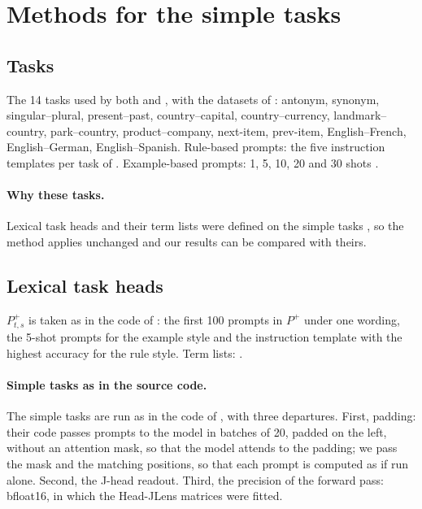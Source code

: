 \documentclass[11pt,a4paper]{article}
\begin{document}
\section{Methods for the simple tasks}\label{sec:methods-simple}

\subsection{Tasks}\label{sec:tasks-simple}
The 14 tasks used by both \citet{yang2026shared} and \citet{davidson2025different}, with the datasets of \citet{todd2024function}: antonym, synonym, singular--plural, present--past, country--capital, country--currency, landmark--country, park--country, product--company, next-item, prev-item, English--French, English--German, English--Spanish.
Rule-based prompts: the five instruction templates per task of \citet[App.~A.3.1]{yang2026shared}.
Example-based prompts: 1, 5, 10, 20 and 30 shots \citep[App.~A.3]{yang2026shared}.

\paragraph{Why these tasks.} Lexical task heads and their term lists were defined on the simple tasks \citep{yang2026shared}, so the method applies unchanged and our results can be compared with theirs.

\subsection{Lexical task heads}\label{sec:lth-simple}
$P^{+}_{t,s}$ is taken as in the code of \citet{yang2026shared}: the first 100 prompts in $P^{+}$ under one wording, the 5-shot prompts for the example style and the instruction template with the highest accuracy for the rule style. Term lists: \citet[App.~A.2.1]{yang2026shared}.

\paragraph{Simple tasks as in the source code.} The simple tasks are run as in the code of \citet{yang2026shared}, with three departures. First, padding: their code passes prompts to the model in batches of 20, padded on the left, without an attention mask, so that the model attends to the padding; we pass the mask and the matching positions, so that each prompt is computed as if run alone. Second, the J-head readout. Third, the precision of the forward pass: bfloat16, in which the Head-JLens matrices were fitted.
\end{document}
